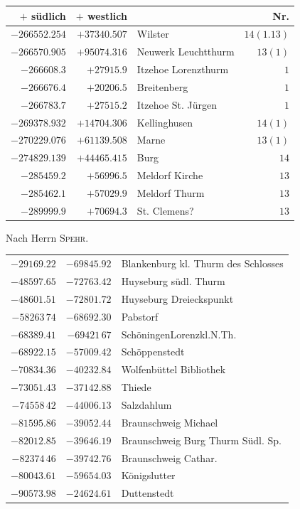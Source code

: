\clearpage
\begin{center}\begingroup\fontsize{8}{9}\selectfont
\setlength{\tabcolsep}{4pt}
\begin{tabular}{r|r|p{170pt}|r}\hline
\(+\) südlich&\(+\) westlich&&Nr.\\\hline
\(-266552.254\)&\(+37340.507\)&Wilster&\(14(1.13)\)\\
\(-266570.905\)&\(+95074.316\)&Neuwerk Leuchtthurm&\(13(1)\)\\
\(-266608.3\)&\(+27915.9\)&Itzehoe Lorenzthurm&\(1\)\\
\(-266676.4\)&\(+20206.5\)&Breitenberg&\(1\)\\
\(-266783.7\)&\(+27515.2\)&Itzehoe St. Jürgen&\(1\)\\
\(-269378.932\)&\(+14704.306\)&Kellinghusen&\(14(1)\)\\
\(-270229.076\)&\(+61139.508\)&Marne&\(13(1)\)\\
\(-274829.139\)&\(+44465.415\)&Burg&\(14\)\\
\(-285459.2\)&\(+56996.5\)&Meldorf Kirche&\(13\)\\
\(-285462.1\)&\(+57029.9\)&Meldorf Thurm&\(13\)\\
\(-289999.9\)&\(+70694.3\)&St. Clemens?&\(13\)\\
\hline\end{tabular}\endgroup\end{center}
\begin{center}Nach Herrn \textsc{Spehr}.\end{center}
\begin{center}\begingroup\fontsize{8}{9}\selectfont
\setlength{\tabcolsep}{4pt}
\begin{tabular}{rrp{190pt}}
\(-29169.22\)&\(-69845.92\)&Blankenburg kl. Thurm des Schlosses\\
\(-48597.65\)&\(-72763.42\)&Huyseburg südl. Thurm\\
\(-48601.51\)&\(-72801.72\)&Huyseburg Dreieckspunkt\\
\(-58263\,74\)&\(-68692.30\)&Pabstorf\\
\(-68389.41\)&\(-69421\,67\)&SchöningenLorenzkl.N.Th.\\
\(-68922.15\)&\(-57009.42\)&Schöppenstedt\\
\(-70834.36\)&\(-40232.84\)&Wolfenbüttel Bibliothek\\
\(-73051.43\)&\(-37142.88\)&Thiede\\
\(-74558\,42\)&\(-44006.13\)&Salzdahlum\\
\(-81595.86\)&\(-39052.44\)&Braunschweig Michael\\
\(-82012.85\)&\(-39646.19\)&Braunschweig Burg Thurm Südl. Sp.\\
\(-82374\,46\)&\(-39742.76\)&Braunschweig Cathar.\\
\(-80043.61\)&\(-59654.03\)&Königslutter\\
\(-90573.98\)&\(-24624.61\)&Duttenstedt\\
\end{tabular}\endgroup\end{center}
